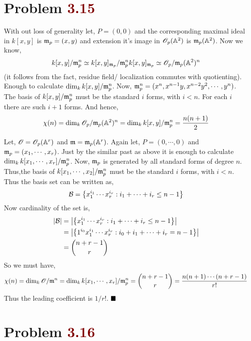 \documentclass[12pt]{article}
\begin{document}
\section{Problem \textcolor{maroon}{3.15}} %

 With out loss of generality let, $P=(0,0)$ and the corresponding maximal ideal in $k[x,y]$ is $\mathfrak{m}_p =(x,y)$ and extension it's image in $\mathscr{O}_p(\mathbb{A}^2)$ is $\mathfrak{m}_p(\mathbb{A}^2)$. Now we know, $$k[x,y]/\mathfrak{m}_p^n \simeq k[x,y]_{\mathfrak{m}_p}/ \mathfrak{m}_p^n k[x,y]_{\mathfrak{m}_p} \simeq \mathscr{O}_p/\mathfrak{m}_p(\mathbb{A}^2)^n$$ (it follows from the fact, residue field/ localization commutes with quotienting). Enough to calculate $\dim_k k[x,y]/\mathfrak{m}_p^n$. Now, $\mathfrak{m}_p^n = (x^n,x^{n-1}y,x^{n-2}y^2,\cdots,y^n)$. The basis of $k[x,y]/\mathfrak{m}_p^n$ must be the standard $i$ forms, with $i<n$. For each $i$ there are such $i+1$ forms. And hence, $$\chi(n) = \dim_k \mathscr{O}_p/\mathfrak{m}_p(\mathbb{A}^2)^n = \dim_k k[x,y]/\mathfrak{m}_p^n = \frac{n(n+1)}{2}$$

\vspace*{0.2cm}


\noindent {} Let, $\mathscr{O} = \mathscr{O}_p(\mathbb{A}^r)$ and $\mathfrak{m} = \mathfrak{m}_p(\mathbb{A}^r)$. Again let, $P=(0,\cdots,0)$ and $\mathfrak{m}_p =(x_1,\cdots,x_r)$. Just by the similar past as above it is enough to calculate $\dim_k k[x_1,\cdots,x_r]/\mathfrak{m}_p^n$. Now, $\mathfrak{m}_p$ is generated by all standard forms of degree $n$. Thus,the basis of $k[x_1,\cdots,x_2]/\mathfrak{m}_p^n$ must be the standard $i$ forms, with $i<n$. Thus the basis set can be written as, 
$$\mathcal{B} = \qty{x_1^{i_1}\cdots x_r^{i_r}:i_1+\cdots +i_r \leq n-1}$$ Now cardinality of the set is, \begin{align*}
    \abs{\mathcal{B}} &= \abs{\qty{x_1^{i_1}\cdots x_r^{i_r}:i_1+\cdots +i_r \leq n-1}} \\
    &= \abs{\qty{1^{i_0}x_1^{i_1}\cdots x_r^{i_r}:i_0+i_1+\cdots +i_r =n-1}} \\
    &= \binom{n+r-1}{r}
\end{align*}
So we must have,  $$\chi(n) = \dim_k \mathscr{O}/\mathfrak{m}^n= \dim_k k[x_1,\cdots,x_r]/\mathfrak{m}_p^n = \binom{n+r-1}{r}= \frac{n(n+1)\cdots (n+r-1)}{r!}$$ Thus the leading coefficient is $1/r!$. $\hfill \blacksquare$

\section{Problem \textcolor{maroon}{3.16}} %
\end{document}

